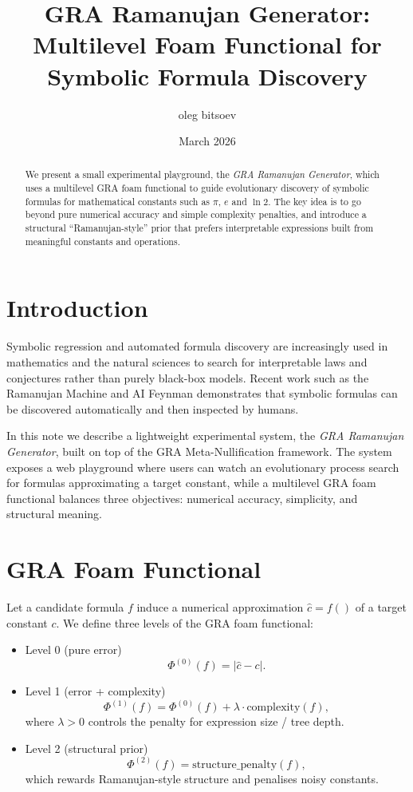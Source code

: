 \documentclass[11pt]{article}
\title{GRA Ramanujan Generator:\\
Multilevel Foam Functional for Symbolic Formula Discovery}
\author{oleg bitsoev}
\date{March 2026}
\begin{document}
\maketitle

\begin{abstract}
We present a small experimental playground, the \emph{GRA Ramanujan Generator}, which uses a multilevel GRA foam functional to guide evolutionary discovery of symbolic formulas for mathematical constants such as $\pi$, $e$ and $\ln 2$. The key idea is to go beyond pure numerical accuracy and simple complexity penalties, and introduce a structural ``Ramanujan-style'' prior that prefers interpretable expressions built from meaningful constants and operations.
\end{abstract}

\section{Introduction}

Symbolic regression and automated formula discovery are increasingly used in mathematics and the natural sciences to search for interpretable laws and conjectures rather than purely black-box models. Recent work such as the Ramanujan Machine and AI Feynman demonstrates that symbolic formulas can be discovered automatically and then inspected by humans.

In this note we describe a lightweight experimental system, the \emph{GRA Ramanujan Generator}, built on top of the GRA Meta-Nullification framework. The system exposes a web playground where users can watch an evolutionary process search for formulas approximating a target constant, while a multilevel GRA foam functional balances three objectives: numerical accuracy, simplicity, and structural meaning.

\section{GRA Foam Functional}

Let a candidate formula $f$ induce a numerical approximation $\hat{c} = f()$ of a target constant $c$.
We define three levels of the GRA foam functional:
\begin{itemize}
  \item Level 0 (pure error)
  \[
    \Phi^{(0)}(f) = | \hat{c} - c |.
  \]
  \item Level 1 (error + complexity)
  \[
    \Phi^{(1)}(f) = \Phi^{(0)}(f) + \lambda \cdot \mathrm{complexity}(f),
  \]
  where $\lambda > 0$ controls the penalty for expression size / tree depth.
  \item Level 2 (structural prior)
  \[
    \Phi^{(2)}(f) = \mathrm{structure\_penalty}(f),
  \]
  which rewards Ramanujan-style structure and penalises noisy constants.
\end{itemize}
\end{document}
